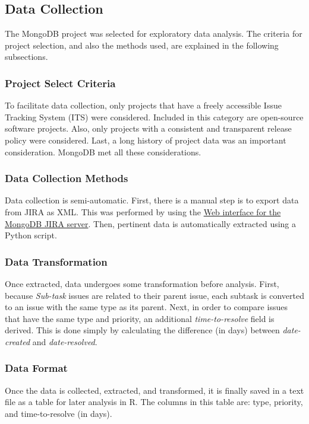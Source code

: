 \documentclass[a4paper]{scrartcl}
\begin{document}
\subsection{Data Collection}
The MongoDB project was selected for exploratory data analysis. The criteria for project selection, and also the methods used, are explained in the following subsections.

\subsubsection{Project Select Criteria}
To facilitate data collection, only projects that have a freely accessible Issue Tracking System (ITS) were considered. Included in this category are open-source software projects. Also, only projects with a consistent and transparent release policy were considered. Last, a long history of project data was an important consideration. MongoDB met all these considerations.

\subsubsection{Data Collection Methods}
Data collection is semi-automatic. First, there is a manual step is to export data from JIRA as XML. This was performed by using the \href{https://jira.mongodb.org}{Web interface for the MongoDB JIRA server}. Then, pertinent data is automatically extracted using a Python script. 

\subsubsection{Data Transformation}
Once extracted, data undergoes some transformation before analysis. First, because \textit{Sub-task} issues are related to their parent issue, each subtask is converted to an issue with the same type as its parent. Next, in order to compare issues that have the same type and priority, an additional \textit{time-to-resolve} field is derived. This  is done simply by calculating the difference (in days) between \textit{date-created} and \textit{date-resolved}.

\subsubsection{Data Format}
Once the data is collected, extracted, and transformed, it is finally saved in a text file as a table for later analysis in R. The columns in this table are: type, priority, and time-to-resolve (in days).
\end{document}
